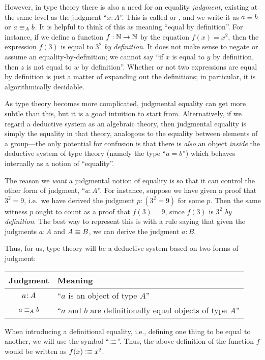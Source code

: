 However, in type theory there is also a need for an equality \emph{judgment}, existing at the same level as the judgment ``$x:A$''.
%
This is called 
%
%
or ,
%
%
and we write it as $a\equiv b$ or $a \equiv_A b$.
It is helpful to think of this as meaning ``equal by definition''.
For instance, if we define a function $f:\mathbb{N}\to\mathbb{N}$ by the equation $f(x)=x^2$, then the expression $f(3)$ is equal to $3^2$ \emph{by definition}.
It does not make sense to negate or assume an equality-by-definition; we cannot say ``if $x$ is equal to $y$ by definition, then $z$ is not equal to $w$ by definition''.
Whether or not two expressions are equal by definition is just a matter of expanding out the definitions; in particular, it is algorithmically decidable.

As type theory becomes more complicated, judgmental equality can get more subtle than this, but it is a good intuition to start from.
Alternatively, if we regard a deductive system as an algebraic theory, then judgmental equality is simply the equality in that theory, analogous to the equality between elements of a group---the only potential for confusion is that there is \emph{also} an object \emph{inside} the deductive system of type theory (namely the type ``$a=b$'') which behaves internally as a notion of ``equality''.

The reason we \emph{want} a judgmental notion of equality is so that it can control the other form of judgment, ``$a:A$''.
For instance, suppose we have given a proof that $3^2=9$, i.e.\ we have derived the judgment $p:(3^2=9)$ for some $p$.
Then the same witness $p$ ought to count as a proof that $f(3)=9$, since $f(3)$ is $3^2$ \emph{by definition}.
The best way to represent this is with a rule saying that given the judgments $a:A$ and $A\equiv B$, we can derive the judgment $a:B$.

Thus, for us, type theory will be a deductive system based on two forms of judgment:
\begin{center}
\medskip
\begin{tabular}{cl}
  \toprule
  Judgment & Meaning\\
  \midrule
  $a : A$       & ``$a$ is an object of type $A$''\\
  $a \equiv_A b$ & ``$a$ and $b$ are definitionally equal objects of type $A$''\\
  \bottomrule
\end{tabular}
\medskip
\end{center}
%
%
When introducing a definitional equality, i.e., defining one thing to be equal to another, we will use the symbol ``$\vcentcolon\equiv$''.
Thus, the above definition of the function $f$ would be written as $f(x)\vcentcolon\equiv x^2$.

